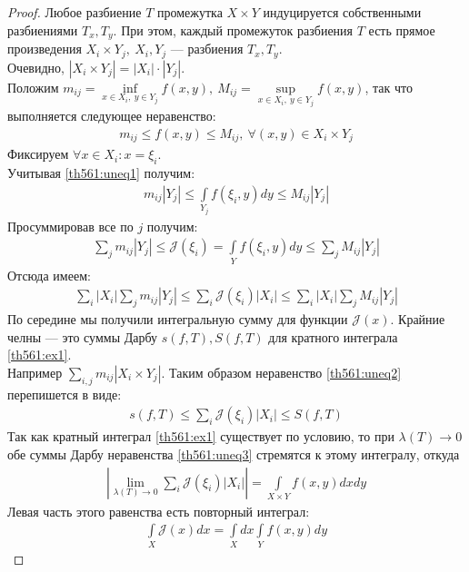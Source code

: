 \begin{proof}
  Любое разбиение $T$ промежутка $X \times Y$ индуцируется собственными
  разбиениями $T_x, T_y$. При этом, каждый промежуток разбиения $T$ есть прямое
  произведения $X_i \times Y_j, \ X_i, Y_j$ --- разбиения $T_x, T_y$. \\
  Очевидно, $|X_i \times Y_j| = |X_i| \cdot |Y_j|$. \\
  Положим $m_{ij} = \inf\limits_{x \in X_i, \ y \in Y_j} f(x, y), \ M_{ij} =
  \sup\limits_{x \in X_i, \ y \in Y_j} f(x, y)$, так что выполняется следующее
  неравенство:
  \begin{gather}
    m_{ij} \leq f(x, y) \leq M_{ij}, \ \forall (x, y) \in X_i \times Y_j
    \label{th561:uneq1}
  \end{gather}
  Фиксируем $\forall x \in X_i: x = \xi_i$. \\
  Учитывая \eqref{th561:uneq1} получим:
  \begin{gather*}
    m_{ij} |Y_j| \leq \int\limits_{Y_j} f(\xi_i, y) dy \leq M_{ij} |Y_j|
  \end{gather*}
  Просуммировав все по $j$ получим:
  \begin{gather*}
    \sum\limits_{j} m_{ij} |Y_j| \leq \mathcal{J}(\xi_i) = \int\limits_Y
    f(\xi_i, y) dy \leq \sum\limits_j M_{ij} |Y_j|
  \end{gather*}
  Отсюда имеем:
  \begin{gather}
    \sum\limits_{i} |X_i| \sum\limits_j m_{ij} |Y_j| \leq \sum\limits_{i}
    \mathcal{J}(\xi_i) |X_i| \leq \sum\limits_{i} |X_i| \sum\limits_{j} M_{ij}
    |Y_j|
    \label{th561:uneq2}
  \end{gather}
  По середине мы получили интегральную сумму для функции $\mathcal{J}(x)$.
  Крайние челны --- это суммы Дарбу $s(f, T), S(f, T)$ для кратного интеграла
  \eqref{th561:ex1}. \\
  Например $\sum\limits_{i, j} m_{ij} |X_i \times Y_j|$. Таким образом
  неравенство \eqref{th561:uneq2} перепишется в виде:
  \begin{gather}
    s(f, T) \leq \sum\limits_{i} \mathcal{J}(\xi_i) |X_i| \leq S(f, T)
    \label{th561:uneq3}
  \end{gather}
  Так как кратный интеграл \eqref{th561:ex1} существует по условию, то при
  $\lambda(T) \to 0$ обе суммы Дарбу неравенства \eqref{th561:uneq3} стремятся
  к этому интегралу, откуда
  \begin{gather*}
    \left|\lim\limits_{\lambda(T) \to 0} \sum\limits_{i} \mathcal{J}(\xi_i)
    |X_i| \right| = \int\limits_{X \times Y} f(x, y) dx dy
  \end{gather*}
  Левая часть этого равенства есть повторный интеграл:
  \begin{gather*}
    \int\limits_X \mathcal{J}(x) dx = \int\limits_X dx \int\limits_Y f(x, y) dy
  \end{gather*}
\end{proof}

